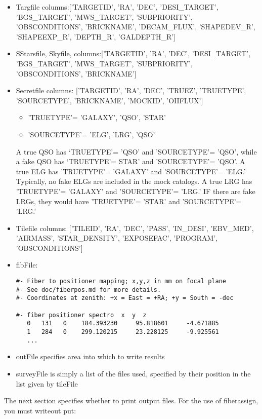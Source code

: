 \documentclass[12pt]{article}
\begin{document}
\begin{itemize}
\item Targfile columns:['TARGETID',
 'RA',
 'DEC',
 'DESI\_TARGET',
 'BGS\_TARGET',
 'MWS\_TARGET',
 'SUBPRIORITY',
 'OBSCONDITIONS',
 'BRICKNAME',
 'DECAM\_FLUX',
 'SHAPEDEV\_R',
 'SHAPEEXP\_R',
 'DEPTH\_R',
 'GALDEPTH\_R']
 \item SStarsfile, Skyfile,  columns:['TARGETID',
 'RA',
 'DEC',
 'DESI\_TARGET',
 'BGS\_TARGET',
 'MWS\_TARGET',
 'SUBPRIORITY',
 'OBSCONDITIONS',
 'BRICKNAME']
\item Secretfile columns: ['TARGETID',
 'RA',
 'DEC',
 'TRUEZ',
 'TRUETYPE',
 'SOURCETYPE',
 'BRICKNAME',
 'MOCKID',
 'OIIFLUX']
 \begin{itemize}
 \item 'TRUETYPE'= {'GALAXY', 'QSO', 'STAR'}
 \end{itemize}
 \begin{itemize}
 \item 'SOURCETYPE'= {'ELG', 'LRG', 'QSO'}
 \end{itemize}
 A true QSO has `TRUETYPE'= 'QSO' and 'SOURCETYPE'=  'QSO', while a fake QSO has `TRUETYPE'= STAR' and 'SOURCETYPE'=  'QSO'.  A true ELG has 'TRUETYPE'= 'GALAXY' and  'SOURCETYPE'=  'ELG.' Typically, no fake ELGs are included in the mock catalogs.  A true LRG has 'TRUETYPE'= 'GALAXY' and  'SOURCETYPE'=  'LRG.' IF there are fake LRGs, they would have   'TRUETYPE'= 'STAR' and  'SOURCETYPE'=  'LRG.'
\item Tilefile columns: ['TILEID',
 'RA',
 'DEC',
 'PASS',
 'IN\_DESI',
 'EBV\_MED',
 'AIRMASS',
 'STAR\_DENSITY',
 'EXPOSEFAC',
 'PROGRAM',
 'OBSCONDITIONS']
\item fibFile:
\begin{verbatim}
#- Fiber to positioner mapping; x,y,z in mm on focal plane
#- See doc/fiberpos.md for more details.
#- Coordinates at zenith: +x = East = +RA; +y = South = -dec

#- fiber positioner spectro  x  y  z
   0   131   0    184.393230     95.818601     -4.671885
   1   284   0    299.120215     23.228125     -9.925561
   ...
   \end{verbatim}
   \item outFile specifies area into which to write results
   \item surveyFile is simply a list of the files used, specified by their position in the list given by tileFile
   
 \end{itemize}
 The next section specifies whether to print output files.  For the use of fiberassign, you must writeout put: 
 
\end{document}
